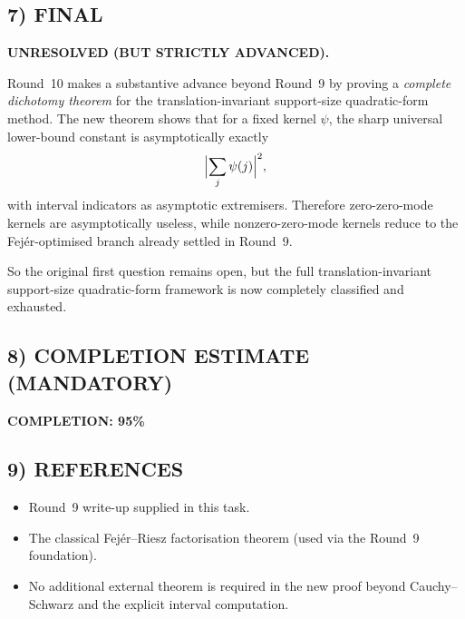 \subsection{7) FINAL}

\textbf{UNRESOLVED (BUT STRICTLY ADVANCED).}

Round~10 makes a substantive advance beyond Round~9 by proving a \emph{complete dichotomy theorem} for the translation-invariant support-size quadratic-form method. The new theorem shows that for a fixed kernel \(\psi\), the sharp universal lower-bound constant is asymptotically exactly
\[
\Bigl|\sum_j\psi(j)\Bigr|^2,
\]
with interval indicators as asymptotic extremisers. Therefore zero-zero-mode kernels are asymptotically useless, while nonzero-zero-mode kernels reduce to the Fej\'er-optimised branch already settled in Round~9.

So the original first question remains open, but the full translation-invariant support-size quadratic-form framework is now completely classified and exhausted.

\subsection{8) COMPLETION ESTIMATE (MANDATORY)}

\textbf{COMPLETION: 95\%}

\subsection{9) REFERENCES}

\begin{itemize}
\item Round~9 write-up supplied in this task.
\item The classical Fej\'er--Riesz factorisation theorem (used via the Round~9 foundation).
\item No additional external theorem is required in the new proof beyond Cauchy--Schwarz and the explicit interval computation.
\end{itemize}
